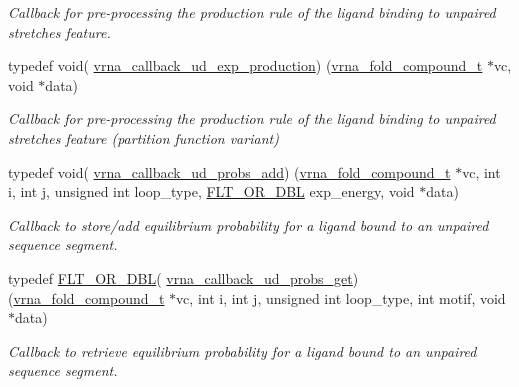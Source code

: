 \begin{DoxyCompactItemize}
\begin{DoxyCompactList}\small\item\em Callback for pre-\/processing the production rule of the ligand binding to unpaired stretches feature. \end{DoxyCompactList}\item 
typedef void( \hyperlink{group__domains__up_gae4c18aa60c657a4a856a4b41a9fbc0dc}{vrna\+\_\+callback\+\_\+ud\+\_\+exp\+\_\+production}) (\hyperlink{group__fold__compound_ga1b0cef17fd40466cef5968eaeeff6166}{vrna\+\_\+fold\+\_\+compound\+\_\+t} $\ast$vc, void $\ast$data)\hypertarget{group__domains__up_gae4c18aa60c657a4a856a4b41a9fbc0dc}{}\label{group__domains__up_gae4c18aa60c657a4a856a4b41a9fbc0dc}

\begin{DoxyCompactList}\small\item\em Callback for pre-\/processing the production rule of the ligand binding to unpaired stretches feature (partition function variant) \end{DoxyCompactList}\item 
typedef void( \hyperlink{group__domains__up_gacf121219e336f14d288a304564307f67}{vrna\+\_\+callback\+\_\+ud\+\_\+probs\+\_\+add}) (\hyperlink{group__fold__compound_ga1b0cef17fd40466cef5968eaeeff6166}{vrna\+\_\+fold\+\_\+compound\+\_\+t} $\ast$vc, int i, int j, unsigned int loop\+\_\+type, \hyperlink{group__data__structures_ga31125aeace516926bf7f251f759b6126}{F\+L\+T\+\_\+\+O\+R\+\_\+\+D\+BL} exp\+\_\+energy, void $\ast$data)\hypertarget{group__domains__up_gacf121219e336f14d288a304564307f67}{}\label{group__domains__up_gacf121219e336f14d288a304564307f67}

\begin{DoxyCompactList}\small\item\em Callback to store/add equilibrium probability for a ligand bound to an unpaired sequence segment. \end{DoxyCompactList}\item 
typedef \hyperlink{group__data__structures_ga31125aeace516926bf7f251f759b6126}{F\+L\+T\+\_\+\+O\+R\+\_\+\+D\+BL}( \hyperlink{group__domains__up_ga13eb77d5c404b08a8868e382a66ab8bb}{vrna\+\_\+callback\+\_\+ud\+\_\+probs\+\_\+get}) (\hyperlink{group__fold__compound_ga1b0cef17fd40466cef5968eaeeff6166}{vrna\+\_\+fold\+\_\+compound\+\_\+t} $\ast$vc, int i, int j, unsigned int loop\+\_\+type, int motif, void $\ast$data)\hypertarget{group__domains__up_ga13eb77d5c404b08a8868e382a66ab8bb}{}\label{group__domains__up_ga13eb77d5c404b08a8868e382a66ab8bb}

\begin{DoxyCompactList}\small\item\em Callback to retrieve equilibrium probability for a ligand bound to an unpaired sequence segment. \end{DoxyCompactList}\end{DoxyCompactItemize}
